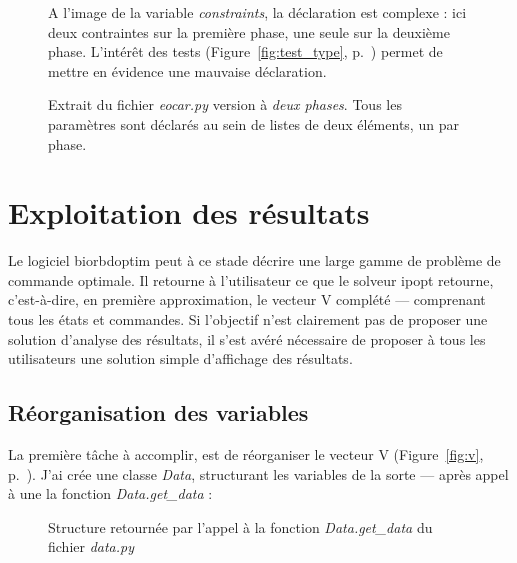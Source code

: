 \newpage
\begin{center}
\setlength\itemsep{-0.5em}

\vspace{-0.6cm}
\begin{figure}[h]
\caption{Extrait du fichier \emph{eocar.py} version à \emph{deux phases}. Tous les paramètres sont déclarés au sein de listes de deux éléments, un par phase.}
\label{fig:eocar_phases}
A l'image de la variable \emph{constraints}, la déclaration est complexe : ici deux contraintes sur la première phase, une seule sur la deuxième phase. L'intérêt des tests (Figure~\ref{fig:test_type}, p.~\pageref{fig:test_type}) permet de mettre en évidence une mauvaise déclaration.
\end{figure}
\end{center}

        \section{Exploitation des résultats}
Le logiciel \gls{biorbdoptim} peut à ce stade décrire une large gamme de problème de commande optimale. Il retourne à l'utilisateur ce que le solveur \gls{ipopt} retourne, c'est-à-dire, en première approximation, le vecteur V complété --- comprenant tous les états et commandes.
Si l'objectif n'est clairement pas de proposer une solution d'analyse des résultats, il s'est avéré nécessaire de proposer à tous les utilisateurs une solution simple d'affichage des résultats.
        
            \subsection{Réorganisation des variables}

La première tâche à accomplir, est de réorganiser le vecteur V (Figure~\ref{fig:v}, p.~\pageref{fig:v}). J'ai crée une classe \emph{Data}, structurant les variables de la sorte --- après appel à une la fonction \emph{Data.get\_data} :

\begin{figure}[h]
\caption{Structure retournée par l'appel à la fonction \emph{Data.get\_data} du fichier \emph{data.py}}
\label{fig:data}
\end{figure}


